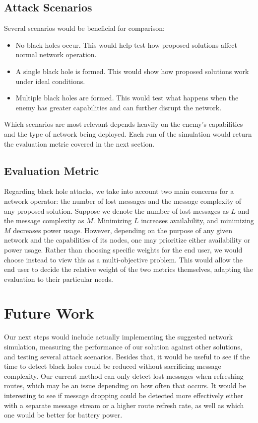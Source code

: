\documentclass[12pt,a4paper]{report}
\begin{document}
\subsection{Attack Scenarios}
Several scenarios would be beneficial for comparison:
\begin{itemize}
    \item No black holes occur. This would help test how proposed solutions affect normal network operation.
    \item A single black hole is formed. This would show how proposed solutions work under ideal conditions.
    \item Multiple black holes are formed. This would test what happens when the enemy has greater capabilities and can further disrupt the network.
\end{itemize}
Which scenarios are most relevant depends heavily on the enemy's capabilities and the type of network being deployed. Each run of the simulation would return the evaluation metric covered in the next section.

\subsection{Evaluation Metric}
Regarding black hole attacks, we take into account two main concerns for a network operator: the number of lost messages and the message complexity of any proposed solution. Suppose we denote the number of lost messages as $L$ and the message complexity as $M$. Minimizing $L$ increases availability, and minimizing $M$ decreases power usage. However, depending on the purpose of any given network and the capabilities of its nodes, one may prioritize either availability or power usage. Rather than choosing specific weights for the end user, we would choose instead to view this as a multi-objective problem. This would allow the end user to decide the relative weight of the two metrics themselves, adapting the evaluation to their particular needs.

\section{Future Work}
Our next steps would include actually implementing the suggested network simulation, measuring the performance of our solution against other solutions, and testing several attack scenarios. Besides that, it would be useful to see if the time to detect black holes could be reduced without sacrificing message complexity. Our current method can only detect lost messages when refreshing routes, which may be an issue depending on how often that occurs. It would be interesting to see if message dropping could be detected more effectively either with a separate message stream or a higher route refresh rate, as well as which one would be better for battery power.



\end{document}
